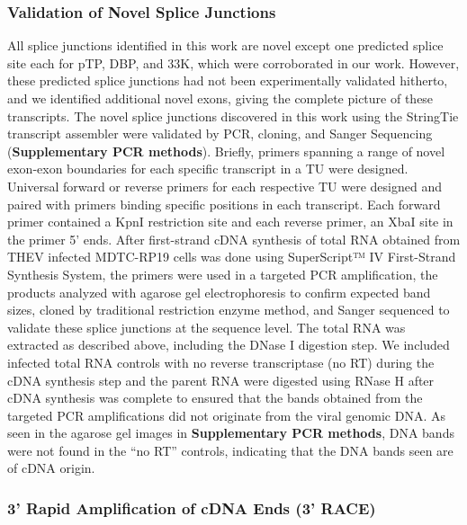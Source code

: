 \documentclass[
]{article}
\begin{document}
\subsubsection{Validation of Novel Splice
Junctions}\label{validation-of-novel-splice-junctions}

All splice junctions identified in this work are novel except one
predicted splice site each for pTP, DBP, and 33K, which were
corroborated in our work. However, these predicted splice junctions had
not been experimentally validated hitherto, and we identified additional
novel exons, giving the complete picture of these transcripts. The novel
splice junctions discovered in this work using the StringTie transcript
assembler were validated by PCR, cloning, and Sanger Sequencing
(\textbf{Supplementary PCR methods}). Briefly, primers spanning a range
of novel exon-exon boundaries for each specific transcript in a TU were
designed. Universal forward or reverse primers for each respective TU
were designed and paired with primers binding specific positions in each
transcript. Each forward primer contained a KpnI restriction site and
each reverse primer, an XbaI site in the primer 5' ends. After
first-strand cDNA synthesis of total RNA obtained from THEV infected
MDTC-RP19 cells was done using SuperScript™ IV First-Strand Synthesis
System, the primers were used in a targeted PCR amplification, the
products analyzed with agarose gel electrophoresis to confirm expected
band sizes, cloned by traditional restriction enzyme method, and Sanger
sequenced to validate these splice junctions at the sequence level. The
total RNA was extracted as described above, including the DNase I
digestion step. We included infected total RNA controls with no reverse
transcriptase (no RT) during the cDNA synthesis step and the parent RNA
were digested using RNase H after cDNA synthesis was complete to ensured
that the bands obtained from the targeted PCR amplifications did not
originate from the viral genomic DNA. As seen in the agarose gel images
in \textbf{Supplementary PCR methods}, DNA bands were not found in the
``no RT'' controls, indicating that the DNA bands seen are of cDNA
origin.

\subsubsection{3' Rapid Amplification of cDNA Ends (3'
RACE)}\label{rapid-amplification-of-cdna-ends-3-race}
\end{document}
